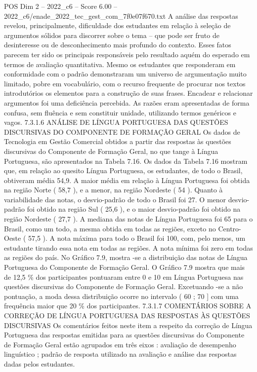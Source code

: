 \begin{textsample}{POS Dim 2 – 2022\_c6 – Score 6.00 – 2022\_c6/enade\_2022\_tec\_gest\_com\_7f0e07f670.txt}
A análise das respostas revelou, principalmente, dificuldade dos estudantes em relação à seleção de argumentos sólidos para discorrer sobre o tema – que pode ser fruto de desinteresse ou de desconhecimento mais profundo do contexto.
Esses fatos parecem ter sido os principais responsáveis pelo resultado aquém do esperado em termos de avaliação quantitativa.
Mesmo os estudantes que responderam em conformidade com o padrão demonstraram um universo de argumentação muito limitado, pobre em vocabulário, com o recurso frequente de procurar nos textos introdutórios os elementos para a construção de suas frases.
Encadear e relacionar argumentos foi uma deficiência percebida.
As razões eram apresentadas de forma confusa, sem fluência e sem constituir unidade, utilizando termos genéricos e vagos. 7.3.1.6 ANÁLISE DE LÍNGUA PORTUGUESA DAS QUESTÕES DISCURSIVAS DO COMPONENTE DE FORMAÇÃO GERAL Os dados de Tecnologia em Gestão Comercial obtidos a partir das respostas às questões discursivas do Componente de Formação Geral, no que tange à Língua Portuguesa, são apresentados na Tabela 7.16.
Os dados da Tabela 7.16 mostram que, em relação ao quesito Língua Portuguesa, os estudantes, de todo o Brasil, obtiveram média 54,9.
A maior média em relação à Língua Portuguesa foi obtida na região Norte ( 58,7 ), e a menor, na região Nordeste ( 54 ).
Quanto à variabilidade das notas, o desvio-padrão de todo o Brasil foi 27.
O menor desvio-padrão foi obtido na região Sul ( 25,6 ), e o maior desvio-padrão foi obtido na região Nordeste ( 27,7 ).
A mediana das notas de Língua Portuguesa foi 65 para o Brasil, como um todo, a mesma obtida em todas as regiões, exceto no Centro-Oeste ( 57,5 ).
A nota máxima para todo o Brasil foi 100, com, pelo menos, um estudante tirando essa nota em todas as regiões.
A nota mínima foi zero em todas as regiões do país.
No Gráfico 7.9, mostra -se a distribuição das notas de Língua Portuguesa do Componente de Formação Geral.
O Gráfico 7.9 mostra que mais de 12,5 \% dos participantes pontuaram entre 0 e 10 em Língua Portuguesa nas questões discursivas do Componente de Formação Geral.
Excetuando -se a não pontuação, a moda dessa distribuição ocorre no intervalo ( 60 ; 70 ] com uma frequência maior que 20 \% dos participantes. 7.3.1.7 COMENTÁRIOS SOBRE A CORREÇÃO DE LÍNGUA PORTUGUESA DAS RESPOSTAS ÀS QUESTÕES DISCURSIVAS Os comentários feitos neste item a respeito da correção de Língua Portuguesa das respostas emitidas para as questões discursivas do Componente de Formação Geral estão agrupados em três eixos : avaliação de desempenho linguístico ; padrão de resposta utilizado na avaliação e análise das respostas dadas pelos estudantes.

\end{textsample}
